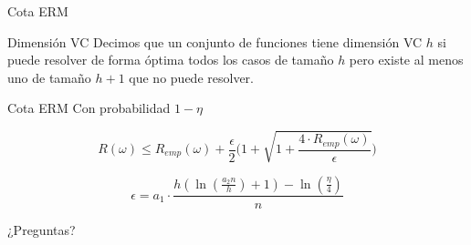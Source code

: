 \documentclass[10pt]{beamer}
\begin{document}
\begin{frame}[fragile]{Cota ERM}
\vspace{10px}
\pause
{}

\begin{block}{Dimensión VC}
	Decimos que un conjunto de funciones tiene dimensión VC $h$ si puede resolver de forma óptima todos los casos de tamaño $h$ pero existe al menos uno de tamaño $h+1$ que no puede resolver.
\end{block}

\pause

\begin{block}{Cota ERM}
	Con probabilidad $1-\eta$
	
	$$R(\omega) \leq R_{emp}( \omega) + \frac{\epsilon}{2} \biggl( 1+\sqrt{1+\frac{4\cdot R_{emp}(\omega)}{\epsilon}} \biggl)$$
	
	\pause
	
	$$\epsilon = a_1 \cdot \frac{h(\ln (\frac{a_2 n}{h})+1) - \ln (\frac{\eta}{4})}{n}$$
\end{block}

\end{frame}

\begin{frame}[standout]
	\LARGE{¿Preguntas?}
	\vspace{10px}
\end{frame}
\end{document}
